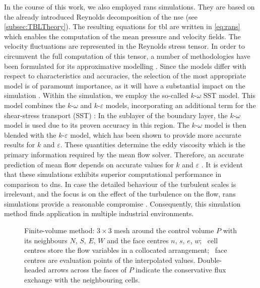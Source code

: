 In the course of this work, we also employed \acrshort{rans} simulations.
They are based on the already introduced Reynolds decomposition of the \acrshort{nse} (see \autoref{subsec:TBLTheory}).
The resulting equations for \acrshort{tbl} are written in \autoref{eq:rans} which enables the computation of the mean pressure and velocity fields.
The velocity fluctuations are represented in the Reynolds stress tensor. 
In order to circumvent the full computation of this tensor, a number of methodologies have been formulated for its approximative modelling \citep{wilcox_turbulence_2006}. 
Since the models differ with respect to characteristics and accuracies, the selection of the most appropriate model is of paramount importance, as it will have a substantial impact on the simulation \citep{yang_assessment_2016}.
Within the simulation, we employ the so-called $k\text{-}\omega$ SST model.
This model combines the $k\text{-}\omega$ and $k\text{-}\varepsilon$ models, incorporating an additional term for the shear-stress transport (SST) \citep{menter_two-equation_1994}:
In the sublayer of the boundary layer, the $k\text{-}\omega$ model is used due to its proven accuracy in this region. 
The $k\text{-}\omega$ model is then blended with the $k\text{-}\varepsilon$ model, which has been shown to provide more accurate results for $k$ and $\varepsilon$.
These quantities determine the eddy viscosity which is the primary information required by the mean flow solver. 
Therefore, an accurate prediction of mean flow depends on accurate values for $k$ and $\varepsilon$ \citep{menter_two-equation_1994}.
It is evident that these simulations exhibits superior computational performance in comparison to \acrshort{dns}.
In case the detailed behaviour of the turbulent scales is irrelevant, and the focus is on the effect of the turbulence on the flow, \acrshort{rans} simulations provide a reasonable compromise \citep{alfonsi_reynolds-averaged_2009}.
Consequently, this simulation method finds application in multiple industrial environments.


\begin{figure}[h!]
    \centering
    
    \caption[Finite-volume method visualised for a $3\times3$ mesh with collocated arrangement]{%
    Finite-volume method: $3\times3$ mesh
    around the control volume $P$ with its neighbours $N$, $S$, $E$, $W$ and
    the face centres $n$, $s$, $e$, $w$;
    \centermark~cell centres store the flow variables in a collocated arrangement;
    \facemark~face centres are evaluation points of the interpolated values.
    Double-headed arrows across the faces of $P$ indicate the conservative flux
    exchange with the neighbouring cells.}
    \label{fig:FVMMethod}
\end{figure}

